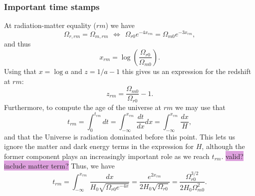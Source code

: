 \documentclass{aa}
\begin{document}
\subsubsection{Important time stamps}
At radiation-matter equality ($rm$) we have
\begin{equation}
    \Omega_{r,rm} = \Omega_{m,rm} 
    \hspace{5pt}\Leftrightarrow\hspace{5pt} 
    \Omega_{r0}e^{-4x_{rm}} = \Omega_{m0}e^{-3x_{rm}}, 
\end{equation}
and thus
\begin{equation}
  x_{rm} = \log\left(\frac{\Omega_{r0}}{\Omega_{m0}}\right).
\end{equation}
Using that $x = \log a$ and $z = 1/a - 1$ this gives us an expression for the redshift at $rm$:
\begin{equation}
  z_{rm} = \frac{\Omega_{m0}}{\Omega_{r0}} - 1.
\end{equation}
Furthermore, to compute the age of the universe at $rm$ we may use that
\begin{equation}
  t_{rm} = \int^{t_{rm}}_{0}dt = \int^{x_{rm}}_{-\infty}\frac{dt}{dx}dx = \int^{x_{rm}}_{-\infty}\frac{dx}{H},
\end{equation}
and that the Universe is radiation dominated before this point. This lets us ignore the matter and dark energy terms in the expression for $H$, although the former component plays an increasingly important role as we reach $t_{rm}$. \colorbox{Plum}{valid? include matter term?} Thus, we have
\begin{equation}
  t_{rm} = \int^{x_{rm}}_{-\infty}\frac{dx}{H_0\sqrt{\Omega_{r0}e^{-4x}}} = \frac{e^{2x_{rm}}}{2H_0\sqrt{\Omega_{r0}}} = \frac{\Omega_{r0}^{3/2}}{2H_0\Omega_{m0}^2}.
\end{equation}
\end{document}
